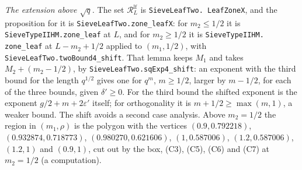 \documentclass[11pt]{article}
\newcommand{\lean}[1]{\texttt{#1}}
\numberwithin{equation}{section}
\begin{document}
\emph{The extension above $\sqrt q$.} The set $\mathcal R^{\mathrm{lf}}_L$ is \lean{SieveLeafTwo.\allowbreak
LeafZoneX}, and the proposition for it is \lean{SieveLeafTwo.\allowbreak zone\_leafX}: for $m_2 \le 1/2$ it is
\lean{SieveTypeIIHM.\allowbreak zone\_leaf} at $L$, and for $m_2 \ge 1/2$ it is \lean{SieveTypeIIHM.\allowbreak
zone\_leaf} at $L - m_2 + 1/2$ applied to $(m_1, 1/2)$, with \lean{SieveLeafTwo.\allowbreak twoBound4\_shift}. That
lemma keeps $M_1$ and takes $M_2 + (m_2 - 1/2)$, by
\lean{SieveLeafTwo.\allowbreak sqExp4\_shift}: an exponent with the third bound for the length $q^{1/2}$ gives one for
$q^m$, $m \ge 1/2$, larger by $m - 1/2$, for each of the three bounds, given $\delta' \ge 0$. For the third bound the
shifted exponent is the exponent $g/2 + m + 2\varepsilon'$ itself; for orthogonality it is $m + 1/2 \ge \max(m, 1)$, a
weaker bound.
The shift avoids a second case analysis. Above $m_2 = 1/2$ the region in $(m_1, \rho)$ is the polygon with the
vertices $(0.9, 0.792218)$, $(0.932874, 0.718773)$, $(0.980270, 0.621606)$, $(1, 0.587006)$, $(1.2, 0.587006)$, $(1.2,
1)$ and $(0.9, 1)$, cut out by the box, (C3), (C5), (C6) and (C7) at $m_2 = 1/2$ (a computation).
\end{document}
